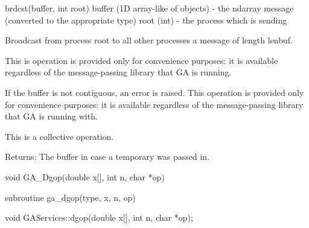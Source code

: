 \documentclass[12pt]{article}
\begin{document}
\begin{pyapi}
\begin{pycode}
brdcst(buffer, int root) 
   buffer (1D array-like of objects) - the ndarray message
                                       (converted to the appropriate type) 
   root (int)                        - the process which is sending 
\end{pycode}
\end{pyapi}

\wcoll
\begin{desc}

Broadcast from process root to all other processes a message of length lenbuf.

This is operation is provided only for convenience purposes: it is available 
regardless of the message-passing library that GA is running.

If the buffer is not contiguous, an error is raised. This operation is provided 
only for convenience purposes: it is available regardless of the message-passing 
library that GA is running with.


This is a collective operation.

Returns: 
The buffer in case a temporary was passed in. 
\end{desc}


\begin{capi}
\begin{ccode}
void GA_Dgop(double x[], int n, char *op)
\end{ccode}
\begin{funcargs}
\end{funcargs}
\end{capi}

\begin{fapi}
\begin{fcode}
subroutine ga_dgop(type, x, n, op)
\end{fcode}
\begin{funcargs}
\end{funcargs}
\end{fapi}

\begin{cxxapi}
\begin{cxxcode}
void GAServices::dgop(double x[], int n, char *op);
\end{cxxcode}
\begin{funcargs}
\end{funcargs}
\end{cxxapi}
\end{document}
